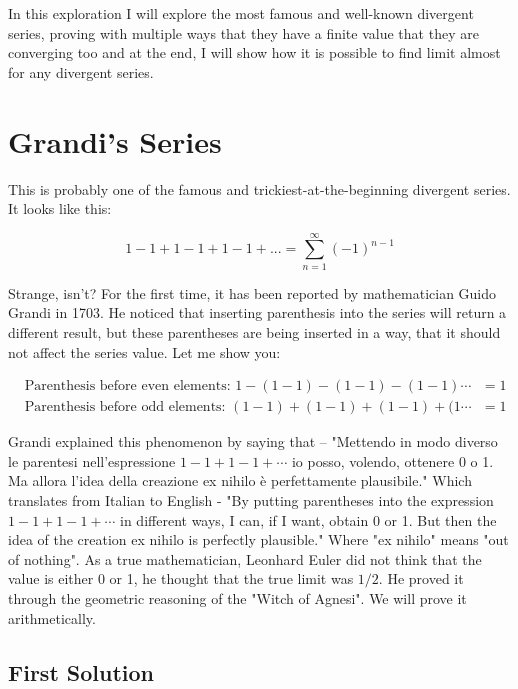 \documentclass[a4paper]{article}
\begin{document}
In this exploration I will explore the most famous and
well-known divergent series, proving with multiple ways that they have a finite
value that they are converging too and at the end, I will show how it is
possible to find limit almost for any divergent series.

\section{Grandi's Series}
\label{sec:org718a73a}
\label{org734cb2a}

This is probably one of the famous and trickiest-at-the-beginning divergent series. It looks like
this: 

\begin{equation}
1-1+1-1+1-1+...=\sum_{n=1}^{\infty} (-1)^{n-1}
\end{equation}

Strange, isn't? For the first time, it has been reported by mathematician Guido
Grandi in 1703. He noticed that inserting parenthesis into the series will
return a different result, but these parentheses are being inserted in a way,
that it should not affect the series value. Let me show you:  

\begin{align*}
&\text{Parenthesis before even elements: } 1-(1-1)-(1-1)-(1-1)\cdots&=1\\
&\text{Parenthesis before odd elements: } (1-1)+(1-1)+(1-1)+(1\cdots&=1
\end{align*}

Grandi explained this phenomenon by saying that – "Mettendo in modo diverso le
parentesi nell'espressione \(1-1+1-1+\cdots\) io posso, volendo, ottenere 0 o 1. Ma
allora l'idea della creazione ex nihilo è perfettamente
plausibile."\cite{Mettendo} Which translates from Italian to English - "By putting
parentheses into the expression \(1-1+1-1+\cdots\) in different ways, I can, if I
want, obtain 0 or 1. But then the idea of the creation ex nihilo is perfectly
plausible." Where "ex nihilo" means "out of nothing".\cite{Exnihilo} As a true
mathematician, Leonhard Euler did not think that the value is either 0 or 1, he
thought that the true limit was \(1/2\). He proved it through the geometric
reasoning of the "Witch of Agnesi". We will prove it arithmetically.

\subsection{First Solution}
\label{sec:org0995f03}
\label{org4ace6df}
\end{document}
